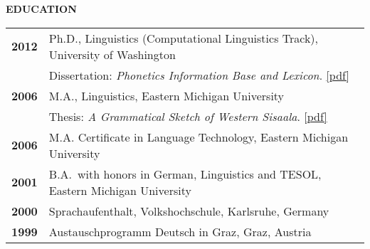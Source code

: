 \documentclass[11pt]{article}
\newcommand{\hangpara}{
 \setlength{\parindent}{0in} %
 \hangindent=0.42in %
}
\begin{document}
\vskip 24pt
\begin{flushleft}
{\bf EDUCATION}
\end{flushleft}
\begin{tabular}{ll}
\bf 2012 & Ph.D., Linguistics (Computational Linguistics Track), University of Washington \\
& Dissertation: \textit{Phonetics Information Base and Lexicon}. \href{https://digital.lib.washington.edu/researchworks/handle/1773/22452}{[pdf]} \\
\bf 2006 & M.A., Linguistics, Eastern Michigan University \\
& Thesis: {\it A Grammatical Sketch of Western Sisaala}. \href{http://commons.emich.edu/theses/73/}{[pdf]}\\
\bf 2006 & M.A. Certificate in Language Technology, Eastern Michigan University \\
\bf 2001 & B.A.\ with honors in German, Linguistics and TESOL, Eastern Michigan University \\
\bf 2000 & Sprachaufenthalt, Volkshochschule, Karlsruhe, Germany \\
\bf 1999 & Austauschprogramm Deutsch in Graz, Graz, Austria \\
\end{tabular}

\begin{comment}
\vskip 24pt
\begin{flushleft}
{\bf EDUCATION}
\end{flushleft}
\begin{tabular}{lll}
\bf 2012 & University of Washington &  Ph.D. in Linguistics (Computational Linguistics Track) \\
\bf 2006 & Eastern Michigan University &  M.A.\ in Linguistics \\
\bf 2006 & Eastern Michigan University &  M.A.\ Certificate in Language Technology \\
\bf 2001 & Eastern Michigan University &  B.A.\ with honors in German, Linguistics and TESOL \\
\bf 2000 & Volkshochschule, Karlsruhe, Germany & Sprachaufenthalt \\
\bf 1999 & Deutsch in Graz, Graz, Austria & Austauschprogramm \\
\end{tabular}
\end{comment}

\begin{comment}
\vskip 6pt
\hangpara
{\bf 2012}\hspace{1ex}Moran, Steven. {\it Phonetics Information Base and Lexicon}. Ph.D. thesis, University of Washington. \url{https://digital.lib.washington.edu/researchworks/handle/1773/22452}

\vskip 6pt
\hangpara
{\bf 2006}\hspace{1ex}Moran, Steven. {\it A Grammatical Sketch of Western Sisaala}. M.A. thesis, Eastern Michigan University. \url{http://commons.emich.edu/theses/73/}
\end{comment}
\end{document}
